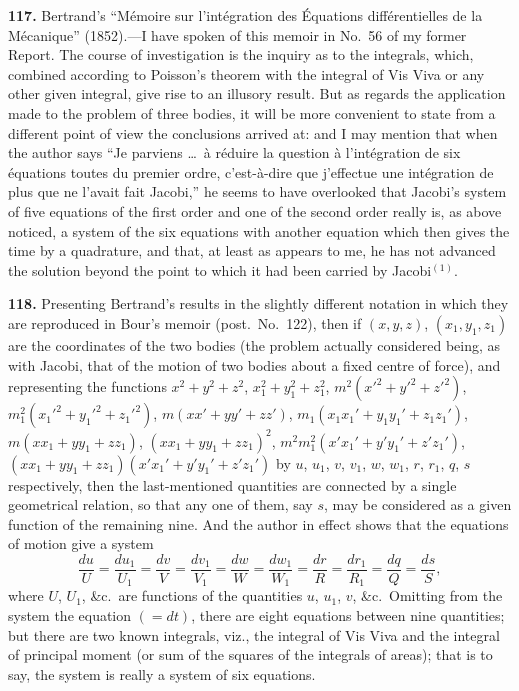 \documentclass[11pt,a4paper]{article}
\theoremstyle{definition}
\begin{document}
\textbf{117.} Bertrand's ``M\'emoire sur l'int\'egration des \'Equations diff\'erentielles de la M\'ecanique'' (1852).---I have spoken of this memoir in No.~56 of my former Report. The course of investigation is the inquiry as to the integrals, which, combined according to Poisson's theorem with the integral of Vis Viva or any other given integral, give rise to an illusory result. But as regards the application made to the problem of three bodies, it will be more convenient to state from a different point of view the conclusions arrived at: and I may mention that when the author says ``Je parviens \dots\ \`a r\'eduire la question \`a l'int\'egration de six \'equations toutes du premier ordre, c'est-\`a-dire que j'effectue une int\'egration de plus que ne l'avait fait Jacobi,'' he seems to have overlooked that Jacobi's system of five equations of the first order and one of the second order really is, as above noticed, a system of the six equations with another equation which then gives the time by a quadrature, and that, at least as appears to me, he has not advanced the solution beyond the point to which it had been carried by Jacobi$^{(1)}$.


\textbf{118.} Presenting Bertrand's results in the slightly different notation in which they are reproduced in Bour's memoir (post.\ No.~122), then if $(x, y, z)$, $(x_1, y_1, z_1)$ are the coordinates of the two bodies (the problem actually considered being, as with Jacobi, that of the motion of two bodies about a fixed centre of force), and representing the functions $x^2 + y^2 + z^2$, $x_1^2 + y_1^2 + z_1^2$, $m^2(x'^2 + y'^2 + z'^2)$, $m_1^2(x_1'^2 + y_1'^2 + z_1'^2)$, $m(xx' + yy' + zz')$, $m_1(x_1x_1' + y_1y_1' + z_1z_1')$, $m(xx_1 + yy_1 + zz_1)$, $(xx_1 + yy_1 + zz_1)^2$, $m^2m_1^2(x'x_1' + y'y_1' + z'z_1')$, $(xx_1 + yy_1 + zz_1)(x'x_1' + y'y_1' + z'z_1')$ by $u$, $u_1$, $v$, $v_1$, $w$, $w_1$, $r$, $r_1$, $q$, $s$ respectively, then the last-mentioned quantities are connected by a single geometrical relation, so that any one of them, say $s$, may be considered as a given function of the remaining nine. And the author in effect shows that the equations of motion give a system
\[
\frac{du}{U} = \frac{du_1}{U_1} = \frac{dv}{V} = \frac{dv_1}{V_1} = \frac{dw}{W} = \frac{dw_1}{W_1} = \frac{dr}{R} = \frac{dr_1}{R_1} = \frac{dq}{Q} = \frac{ds}{S},
\]
where $U$, $U_1$, \&c.\ are functions of the quantities $u$, $u_1$, $v$, \&c.\ Omitting from the system the equation $(=dt)$, there are eight equations between nine quantities; but there are two known integrals, viz., the integral of Vis Viva and the integral of principal moment (or sum of the squares of the integrals of areas); that is to say, the system is really a system of six equations.
\end{document}
